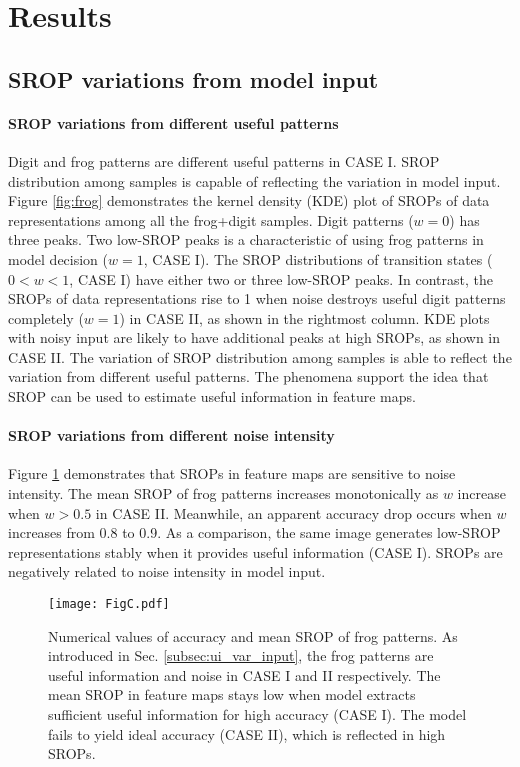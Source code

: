 \documentclass{article}
\begin{document}
\section{Results}
\label{sec:results}
\subsection{SROP variations from model input}\label{sec:results_input}
\paragraph{SROP variations from different useful patterns}
Digit and frog patterns are different useful patterns in CASE I. SROP distribution among samples is capable of reflecting the variation in model input. Figure \ref{fig:frog} demonstrates the kernel density (KDE) plot of SROPs of data representations among all the frog+digit samples. Digit patterns ($w=0$) has three peaks. Two low-SROP peaks is a characteristic of using frog patterns in model decision ($w=1$, CASE I). The SROP distributions of transition states ($0<w<1$, CASE I) have either two or three low-SROP peaks. In contrast, the SROPs of data representations rise to 1 when noise destroys useful digit patterns completely ($w=1$) in CASE II, as shown in the rightmost column. KDE plots with noisy input are likely to have additional peaks at high SROPs, as shown in CASE II. The variation of SROP distribution among samples is able to reflect the variation from different useful patterns. The phenomena support the idea that SROP can be used to estimate useful information in feature maps.
\paragraph{SROP variations from different noise intensity}
Figure \ref{fig:srop_acc} demonstrates that SROPs in feature maps are sensitive to noise intensity. The mean SROP of frog patterns increases monotonically as $w$ increase when $w>0.5$ in CASE II. Meanwhile, an apparent accuracy drop occurs when $w$ increases from 0.8 to 0.9. As a comparison, the same image generates low-SROP representations stably when it provides useful information (CASE I). SROPs are negatively related to noise intensity in model input.

\begin{figure}[h]
    \begin{center}
    \texttt{[image: FigC.pdf]}
    \end{center}
    \caption{Numerical values of accuracy and mean SROP of frog patterns. As introduced in Sec. \ref{subsec:ui_var_input}, the frog patterns are useful information and noise in CASE I and II respectively. The mean SROP in feature maps stays low when model extracts sufficient useful information for high accuracy (CASE I). The model fails to yield ideal accuracy (CASE II), which is reflected in high SROPs.}
    \label{fig:srop_acc}
\end{figure}
\end{document}

